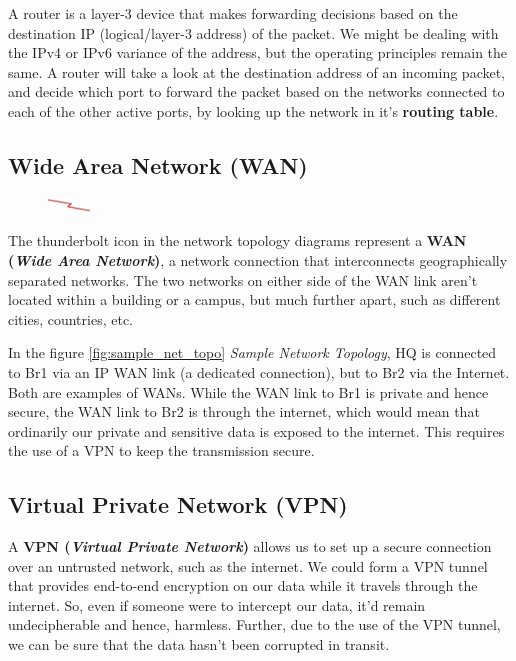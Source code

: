 A router is a layer-3 device that makes forwarding decisions based on the destination IP (logical/layer-3 address) of the packet. We might be dealing with the IPv4 or IPv6 variance of the address, but the operating principles remain the same. A router will take a look at the destination address of an incoming packet, and decide which port to forward the packet based on the networks connected to each of the other active ports, by looking up the network in it's \textbf{routing table}. 

\subsection{Wide Area Network (WAN)}
\begin{figure}
	\centering
	\vspace{-10pt}
	\includegraphics[width=0.1\textwidth]{"Mod1/chapters/1.2.b Network Icons/1.2.b.2 WAN"}
	\vspace{-10pt}
\end{figure}

The thunderbolt icon in the network topology diagrams represent a \textbf{WAN (\textit{Wide Area Network})}, a network connection that interconnects geographically separated networks. The two networks on either side of the WAN link aren't located within a building or a campus, but much further apart, such as different cities, countries, etc. 

In the figure \ref{fig:sample_net_topo} \textit{Sample Network Topology}, HQ is connected to Br1 via an IP WAN link (a dedicated connection), but to Br2 via the Internet. Both are examples of WANs. While the WAN link to Br1 is private and hence secure, the WAN link to Br2 is through the internet, which would mean that ordinarily our private and sensitive data is exposed to the internet. This requires the use of a VPN to keep the transmission secure. 

\subsection{Virtual Private Network (VPN)}
A \textbf{VPN (\textit{Virtual Private Network})} allows us to set up a secure connection over an untrusted network, such as the internet. We could form a VPN tunnel that provides end-to-end encryption on our data while it travels through the internet. So, even if someone were to intercept our data, it'd remain undecipherable and hence, harmless. Further, due to the use of the VPN tunnel, we can be sure that the data hasn't been corrupted in transit. 

